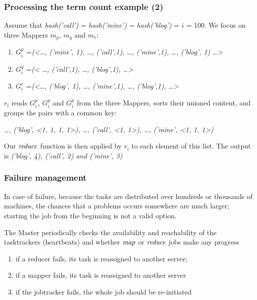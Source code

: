 \begin{frame}
\frametitle{Processing the term count example (2)}

Assume that \textit{hash('call')}  = \textit{hash('mine')} =
\textit{hash('blog')} = $i$ = 100. We focus on three Mappers $m_p$, $m_q$ and
$m_r$:

\begin{enumerate}
  \item $G^p_i$ =\textit{(<\ldots, ('mine', 1), \ldots, ('call',1), \ldots, ('mine',1), \ldots, ('blog', 1) \ldots>}
 \item $G^q_i$ =\textit{(< \ldots, ('call',1), \ldots, ('blog',1), \ldots>}
 \item $G^r_i$ =\textit{(<\ldots, ('blog', 1),  \ldots, ('mine',1), \ldots, ('blog',1), \ldots>}
  \end{enumerate}

\vfill

$r_i$  reads $G^p_i$, $G^p_i$ and $G^p_i$ from  the three Mappers, sorts their unioned content,
and groups the pairs with a common key:
  \begin{center}
  \textit{\ldots, ('blog', <1, 1, 1, 1>), \ldots, ('call', <1, 1>), \ldots, ('mine', <1, 1, 1>)}
\end{center}

\vfill

Our $\mathop{\mathit{reduce}}$ function is then applied by $r_i$ to each element of this list. The output
is \textit{('blog', 4), ('call', 2) and ('mine', 3)}
\end{frame}

\begin{frame}
\frametitle{Failure management}

In case of failure, because the tasks are distributed over
hundreds or thousands of
machines, the chances that a problems occurs somewhere are much larger;
starting the job from the beginning is not a valid option.

\vfill
The  Master
periodically checks the availability and reachability of the tasktrackers
(\alert{heartbeats}) and whether $\mathop{\mathit{map}}$ or $\mathop{\mathit{reduce}}$ jobs make any
\alert{progress}

\medskip

\begin{enumerate}
  \item if a reducer fails, its task is \alert{reassigned to another
server};
  \item if a mapper fails, its task is \alert{reassigned to another
server}
  \item if the jobtracker fails, \alert{the whole job should be
re-initiated}

\end{enumerate}
\end{frame}

